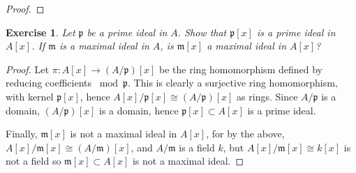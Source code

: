 \documentclass[12pt,letterpaper]{article}
\newtheorem{problem}{Exercise}[section]
\theoremstyle{definition}
\theoremstyle{remark}
\numberwithin{figure}{problem}
\numberwithin{equation}{section}
\begin{document}
\begin{proof}
\end{proof}

\begin{problem}
  Let $\mathfrak{p}$ be a prime ideal in $A$. Show that $\mathfrak{p}[x]$ is a prime ideal in $A[x]$. If $\mathfrak{m}$ is a maximal ideal in $A$, is $\mathfrak{m}[x]$ a maximal ideal in $A[x]$?
\end{problem}
\begin{proof}
  Let $\pi\colon A[x] \to (A/\mathfrak{p})[x]$ be the ring homomorphism defined by reducing coefficients $\bmod \mathfrak{p}$. This is clearly a surjective ring homomorphism, with kernel $\mathfrak{p}[x]$, hence $A[x]/\mathfrak{p}[x] \cong (A/\mathfrak{p})[x]$ as rings. Since $A/\mathfrak{p}$ is a domain, $(A/\mathfrak{p})[x]$ is a domain, hence $\mathfrak{p}[x] \subset A[x]$ is a prime ideal.
  \par Finally, $\mathfrak{m}[x]$ is not a maximal ideal in $A[x]$, for by the above, $A[x]/\mathfrak{m}[x] \cong (A/\mathfrak{m})[x]$, and $A/\mathfrak{m}$ is a field $k$, but $A[x]/\mathfrak{m}[x] \cong k[x]$ is not a field so $\mathfrak{m}[x] \subset A[x]$ is not a maximal ideal.
\end{proof}
\end{document}
